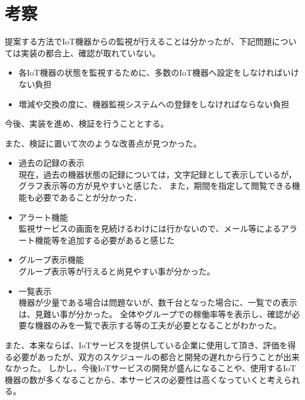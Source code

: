 \section{考察}
提案する方法でIoT機器からの監視が行えることは分かったが、下記問題については実装の都合上、確認が取れていない。
\begin{itemize}
\item 各IoT機器の状態を監視するために、多数のIoT機器へ設定をしなければいけない負担
\item 増減や交換の度に、機器監視システムへの登録をしなければならない負担
\end{itemize}
今後、実装を進め、検証を行うこととする。

また、検証に置いて次のような改善点が見つかった。
\begin{itemize}
\item 過去の記録の表示\\
	現在，過去の機器状態の記録については，文字記録として表示しているが，グラフ表示等の方が見やすいと感じた．
	また，期間を指定して閲覧できる機能も必要であることが分かった．
\item アラート機能\\
	監視サービスの画面を見続けるわけには行かないので、メール等によるアラート機能等を追加する必要があると感じた
\item グループ表示機能\\
	グループ表示等が行えると尚見やすい事が分かった。
\item 一覧表示\\
	機器が少量である場合は問題ないが、数千台となった場合に、一覧での表示は、見難い事が分かった。
	全体やグループでの稼働率等を表示し、確認が必要な機器のみを一覧で表示する等の工夫が必要となることがわかった。
\end{itemize}
また、本来ならば、IoTサービスを提供している企業に使用して頂き、評価を得る必要があったが、双方のスケジュールの都合と開発の遅れから行うことが出来なかった。
しかし、今後IoTサービスの開発が盛んになることや、使用するIoT機器の数が多くなることから、本サービスの必要性は高くなっていくと考えられる。

